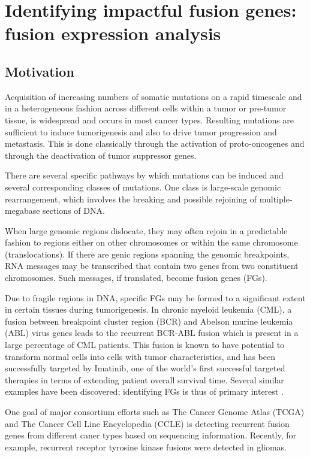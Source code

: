 \chapter{Identifying impactful fusion genes: fusion expression
  analysis}

\section{Motivation}
Acquisition of increasing numbers of somatic mutations on a rapid
timescale and in a heterogeneous fashion across different cells within
a tumor or pre-tumor tissue, is widespread and occurs in most cancer
types. Resulting mutations are sufficient to induce tumorigenesis and
also to drive tumor progression and metastasis. This is done
classically through the activation of proto-oncogenes and through the
deactivation of tumor suppressor genes.


There are several specific pathways by which mutations can be induced
and several corresponding classes of mutations\cite{stratton_cancer_2009}. One class is
large-scale genomic rearrangement, which involves the breaking and
possible rejoining of multiple-megabase sections of DNA.


When large genomic regions dislocate, they may often rejoin in a
predictable fashion to regions either on other chromosomes or within
the same chromosome (translocations).  If there are genic regions
spanning the genomic breakpoints, RNA messages may be transcribed that
contain two genes from two constituent chromosomes. Such messages, if
translated, become fusion genes (FGs).


Due to fragile regions in DNA, specific FGs may be formed to a
significant extent in certain tissues during
tumorigenesis\cite{yunis_constitutive_1984}. In chronic myeloid
leukemia (CML), a fusion between breakpoint cluster region (BCR) and
Abelson murine leukemia (ABL) virus genes leads to the recurrent
BCR-ABL fusion which is present in a large percentage of CML
patients. This fusion is known to have potential to transform normal
cells into cells with tumor characteristics, and has been successfully
targeted by Imatinib, one of the world’s first successful targeted
therapies in terms of extending patient overall survival time. Several
similar examples have been discovered; identifying FGs is thus of
primary interest \cite{chin_cancer_2011}. 

One goal of major consortium efforts such as The Cancer Genome Atlas
(TCGA)\cite{weinstein_cancer_2013} and The Cancer Cell Line
Encyclopedia (CCLE)\cite{barretina_cancer_2012} is detecting recurrent
fusion genes from different caner types based on sequencing
information. Recently, for example, recurrent receptor tyrosine kinase
fusions were detected in gliomas\cite{_comprehensive_2015}.

